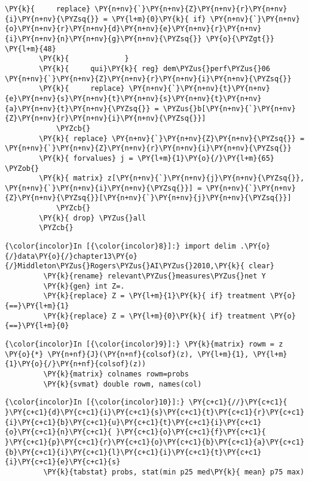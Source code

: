 \documentclass[11pt,notitlepage]{article}\usepackage[]{graphicx}\usepackage[]{color}
\makeatletter
\newenvironment{kframe}{%
 \def\at@end@of@kframe{}%
 \ifinner\ifhmode%
  \def\at@end@of@kframe{\end{minipage}}%
  \begin{minipage}{\columnwidth}%
 \fi\fi%
 \def\FrameCommand##1{\hskip\@totalleftmargin \hskip-\fboxsep
 \colorbox{shadecolor}{##1}\hskip-\fboxsep
     \hskip-\linewidth \hskip-\@totalleftmargin \hskip\columnwidth}%
 \MakeFramed {\advance\hsize-\width
   \@totalleftmargin\z@ \linewidth\hsize
   \@setminipage}}%
 {\par\unskip\endMakeFramed%
 \at@end@of@kframe}
\newenvironment{knitrout}{}{} %
\makeatother
\begin{document}
\begin{enumerate}[a)]
\begin{knitrout}
\begin{kframe}
\begin{Verbatim}[commandchars=\\\{\}]
        \PY{k}{		replace} \PY{n+nv}{`}\PY{n+nv}{Z}\PY{n+nv}{r}\PY{n+nv}{i}\PY{n+nv}{\PYZsq{}} = \PY{l+m}{0}\PY{k}{ if} \PY{n+nv}{`}\PY{n+nv}{o}\PY{n+nv}{r}\PY{n+nv}{d}\PY{n+nv}{e}\PY{n+nv}{r}\PY{n+nv}{i}\PY{n+nv}{n}\PY{n+nv}{g}\PY{n+nv}{\PYZsq{}} \PY{o}{\PYZgt{}} \PY{l+m}{48}
        \PY{k}{				}
        \PY{k}{		qui}\PY{k}{ reg} dem\PYZus{}perf\PYZus{}06 \PY{n+nv}{`}\PY{n+nv}{Z}\PY{n+nv}{r}\PY{n+nv}{i}\PY{n+nv}{\PYZsq{}}		
        \PY{k}{		replace} \PY{n+nv}{`}\PY{n+nv}{t}\PY{n+nv}{e}\PY{n+nv}{s}\PY{n+nv}{t}\PY{n+nv}{s}\PY{n+nv}{t}\PY{n+nv}{a}\PY{n+nv}{t}\PY{n+nv}{\PYZsq{}} = \PYZus{}b[\PY{n+nv}{`}\PY{n+nv}{Z}\PY{n+nv}{r}\PY{n+nv}{i}\PY{n+nv}{\PYZsq{}}]
        	\PYZcb{}
        \PY{k}{	replace} \PY{n+nv}{`}\PY{n+nv}{Z}\PY{n+nv}{\PYZsq{}} = \PY{n+nv}{`}\PY{n+nv}{Z}\PY{n+nv}{r}\PY{n+nv}{i}\PY{n+nv}{\PYZsq{}}
        \PY{k}{	forvalues} j = \PY{l+m}{1}\PY{o}{/}\PY{l+m}{65} \PYZob{}
        \PY{k}{	matrix} z[\PY{n+nv}{`}\PY{n+nv}{j}\PY{n+nv}{\PYZsq{}}, \PY{n+nv}{`}\PY{n+nv}{i}\PY{n+nv}{\PYZsq{}}] = \PY{n+nv}{`}\PY{n+nv}{Z}\PY{n+nv}{\PYZsq{}}[\PY{n+nv}{`}\PY{n+nv}{j}\PY{n+nv}{\PYZsq{}}]
        	\PYZcb{}
        \PY{k}{	drop} \PYZus{}all
        \PYZcb{}
\end{Verbatim}

    \begin{Verbatim}[commandchars=\\\{\}]
{\color{incolor}In [{\color{incolor}8}]:} import delim .\PY{o}{/}data\PY{o}{/}chapter13\PY{o}{/}Middleton\PYZus{}Rogers\PYZus{}AI\PYZus{}2010,\PY{k}{ clear}
         \PY{k}{rename} relevant\PYZus{}measures\PYZus{}net Y
         \PY{k}{gen} int Z=.
         \PY{k}{replace} Z = \PY{l+m}{1}\PY{k}{ if} treatment \PY{o}{==}\PY{l+m}{1}
         \PY{k}{replace} Z = \PY{l+m}{0}\PY{k}{ if} treatment \PY{o}{==}\PY{l+m}{0}
\end{Verbatim}

    \begin{Verbatim}[commandchars=\\\{\}]
{\color{incolor}In [{\color{incolor}9}]:} \PY{k}{matrix} rowm = z \PY{o}{*} \PY{n+nf}{J}(\PY{n+nf}{colsof}(z), \PY{l+m}{1}, \PY{l+m}{1}\PY{o}{/}\PY{n+nf}{colsof}(z))
         \PY{k}{matrix} colnames rowm=probs
         \PY{k}{svmat} double rowm, names(col)
\end{Verbatim}

    \begin{Verbatim}[commandchars=\\\{\}]
{\color{incolor}In [{\color{incolor}10}]:} \PY{c+c1}{//}\PY{c+c1}{ }\PY{c+c1}{d}\PY{c+c1}{i}\PY{c+c1}{s}\PY{c+c1}{t}\PY{c+c1}{r}\PY{c+c1}{i}\PY{c+c1}{b}\PY{c+c1}{u}\PY{c+c1}{t}\PY{c+c1}{i}\PY{c+c1}{o}\PY{c+c1}{n}\PY{c+c1}{ }\PY{c+c1}{o}\PY{c+c1}{f}\PY{c+c1}{ }\PY{c+c1}{p}\PY{c+c1}{r}\PY{c+c1}{o}\PY{c+c1}{b}\PY{c+c1}{a}\PY{c+c1}{b}\PY{c+c1}{i}\PY{c+c1}{l}\PY{c+c1}{i}\PY{c+c1}{t}\PY{c+c1}{i}\PY{c+c1}{e}\PY{c+c1}{s}
         \PY{k}{tabstat} probs, stat(min p25 med\PY{k}{ mean} p75 max)
\end{Verbatim}


\end{kframe}
\end{knitrout}
\end{enumerate}
\end{document}
